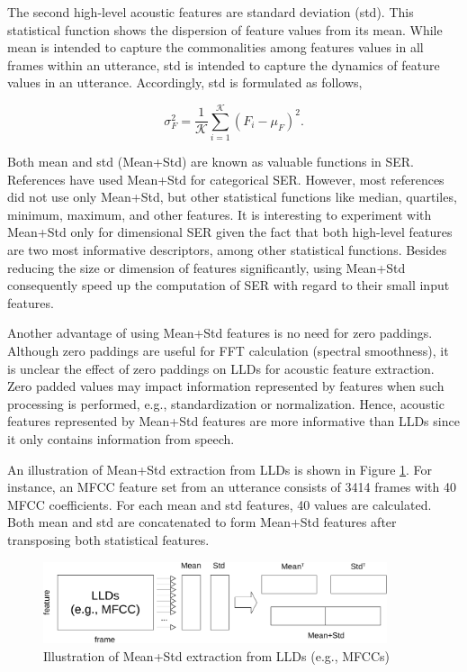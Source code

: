 The second high-level acoustic features are standard deviation (std). This
statistical function shows the dispersion of feature values from its mean.
While mean is intended to capture the commonalities among features values in
all frames within an utterance, std is intended to capture the dynamics of
feature values in an utterance. Accordingly, std is formulated as follows, 

\begin{equation}
  \sigma_F^2 = \frac{1}{\mathcal{K}}\sum _{i=1}^\mathcal{K} (F_i - \mu_F)^2.
\end{equation}

Both mean and std (Mean+Std) are known as valuable functions in SER.
References \cite{Sebastian2019, Morales2016, Tomas2019} have used Mean+Std for
categorical SER. However, most references did not use only Mean+Std, but other
statistical functions like median, quartiles, minimum, maximum, and other
features. It is interesting to experiment with Mean+Std only for dimensional
SER given the fact that both high-level features are two most informative
descriptors, among other statistical functions. Besides reducing the size or
dimension of features significantly, using Mean+Std consequently speed up the
computation of SER with regard to their small input features.

Another advantage of using Mean+Std features is no need for zero paddings.
Although zero paddings are useful for FFT calculation (spectral smoothness), it
is unclear the effect of zero paddings on LLDs for acoustic feature extraction.
Zero padded values may impact information represented by features when such
processing is performed, e.g., standardization or normalization. Hence,
acoustic features represented by Mean+Std features are more informative than
LLDs since it only contains information from speech. 

An illustration of Mean+Std extraction from LLDs is shown in Figure
\ref{fig:mean_std}. For instance, an MFCC feature set from an utterance
consists of 3414 frames with 40 MFCC coefficients. For each mean and std
features, 40 values are calculated. Both mean and std are concatenated to form
Mean+Std features after transposing both statistical features.

\begin{figure}[htbp]
  \centering
  \includegraphics[width=0.9\textwidth]{../fig/mean_std-crop.pdf}
  \caption{Illustration of Mean+Std extraction from LLDs (e.g., MFCCs)}
  \label{fig:mean_std}
\end{figure}

